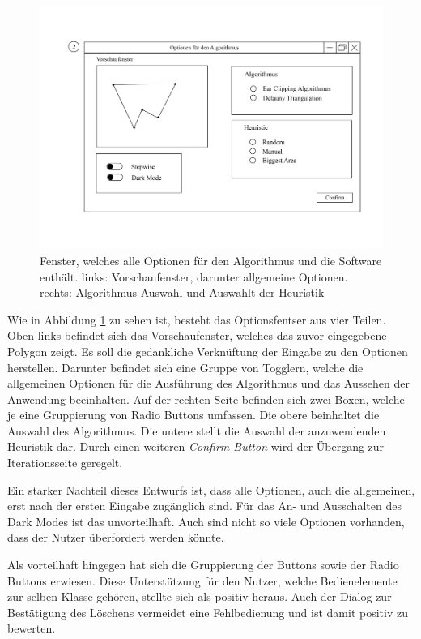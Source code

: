     \begin{figure}[h]
        \includegraphics[width=1\textwidth]{bilder/optionsfenster.png}
        \caption[Ausgelagertes Optionsfenster]{Fenster, welches alle Optionen für den Algorithmus und die Software enthält. links: Vorschaufenster, darunter allgemeine Optionen. rechts: Algorithmus
        Auswahl und Auswahlt der Heuristik}
        \label{fig:options}
    \end{figure}

Wie in Abbildung \ref{fig:options} zu sehen ist, besteht das Optionsfentser aus vier Teilen. Oben links befindet sich das Vorschaufenster, welches das zuvor eingegebene Polygon zeigt. Es soll die gedankliche Verknüftung der Eingabe zu den Optionen herstellen.
Darunter befindet sich eine Gruppe von Togglern, welche die allgemeinen Optionen für die Ausführung des Algorithmus und das Aussehen der Anwendung beeinhalten.
Auf der rechten Seite befinden sich zwei Boxen, welche je eine Gruppierung von Radio Buttons umfassen. Die obere beinhaltet die Auswahl des Algorithmus. Die untere stellt die Auswahl der anzuwendenden Heuristik dar.
Durch einen weiteren \emph{Confirm-Button} wird der Übergang zur Iterationsseite geregelt.

Ein starker Nachteil dieses Entwurfs ist, dass alle Optionen, auch die allgemeinen, erst nach der ersten Eingabe zugänglich sind. Für das An- und Ausschalten des 
Dark Modes ist das unvorteilhaft. Auch sind nicht so viele Optionen vorhanden, dass der Nutzer überfordert werden könnte. 

Als vorteilhaft hingegen hat sich die Gruppierung der Buttons sowie der Radio Buttons erwiesen. Diese Unterstützung für den Nutzer, welche Bedienelemente zur selben Klasse gehören, stellte sich als positiv heraus.
Auch der Dialog zur Bestätigung des Löschens vermeidet eine Fehlbedienung und ist damit positiv zu bewerten.

